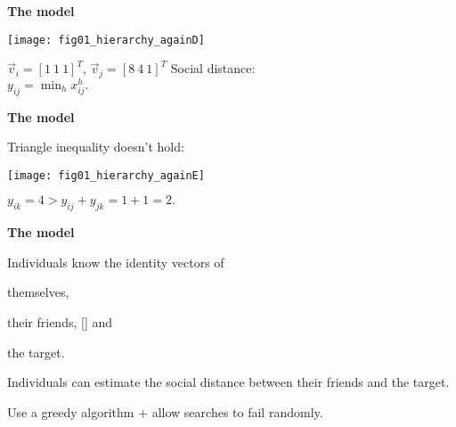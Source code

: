  
% 
% 

  \textbf{The model}

  \begin{center}
    \texttt{[image: fig01\_hierarchy\_againD]}
  \end{center}

  \begin{center}

    $\vec{v}_i = [ 1 \  1 \ 1 ]^T$, $\vec{v}_j = [ 8 \ 4 \ 1]^T$ \hfill
    Social distance:\\
    \hfill
    $ \boxed{y_{ij} = \min_h x^h_{ij}.} $

  \end{center}


% 
% 
% 
% 
%     
% 
% 
% 
% 

  \textbf{The model}

  Triangle inequality doesn't hold:

  \begin{center}
    \texttt{[image: fig01\_hierarchy\_againE]}
  \end{center}

  \begin{center}
    \alert{$y_{ik} = 4 > y_{ij} + y_{jk} = 1 + 1 = 2.$}
  \end{center}
 

  \textbf{The model}

  
   
    Individuals know the identity
    vectors of
    
     
      themselves,
      
      their friends,
    []  
      and
      
      the target.
    
  
    Individuals can estimate the social distance
    between their friends and the target.
  
    Use a greedy algorithm + allow searches to fail randomly.
  
